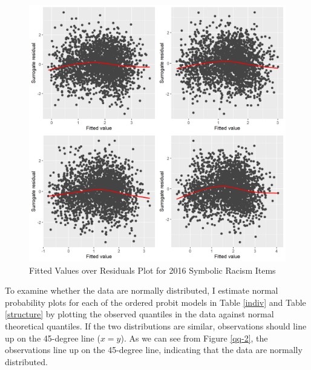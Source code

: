 \documentclass[12pt]{paper}
\begin{document}
\begin{figure}[h!]
	\centering
	\includegraphics[scale=.55]{fig/fitted_residuals_16.png}
	\caption{Fitted Values over Residuals Plot for 2016 Symbolic Racism Items}
	\label{fitted-resid-16}
\end{figure}

To examine whether the data are normally distributed, I estimate normal probability plots for each of the ordered probit models in Table \ref{indiv} and Table \ref{structure} by plotting the observed quantiles in the data against normal theoretical quantiles.  If the two distributions are similar, observations should line up on the 45-degree line ($x=y$). As we can see from Figure \ref{qq-2}, the observations line up on the 45-degree line, indicating that the data are normally distributed. 
\end{document}
